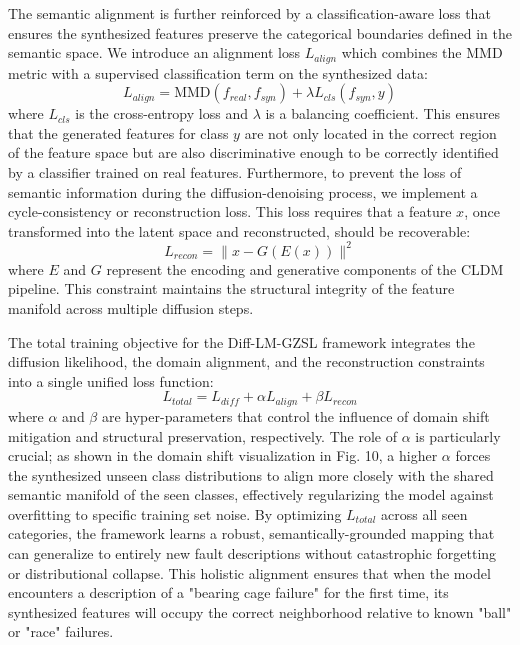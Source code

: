 The semantic alignment is further reinforced by a classification-aware loss that ensures the synthesized features preserve the categorical boundaries defined in the semantic space. We introduce an alignment loss $L_{align}$ which combines the MMD metric with a supervised classification term on the synthesized data:
\begin{equation}
L_{align} = \text{MMD}(f_{real}, f_{syn}) + \lambda L_{cls}(f_{syn}, y)
\end{equation}
where $L_{cls}$ is the cross-entropy loss and $\lambda$ is a balancing coefficient. This ensures that the generated features for class $y$ are not only located in the correct region of the feature space but are also discriminative enough to be correctly identified by a classifier trained on real features. Furthermore, to prevent the loss of semantic information during the diffusion-denoising process, we implement a cycle-consistency or reconstruction loss. This loss requires that a feature $x$, once transformed into the latent space and reconstructed, should be recoverable:
\begin{equation}
L_{recon} = \|x - G(E(x))\|^2
\end{equation}
where $E$ and $G$ represent the encoding and generative components of the CLDM pipeline. This constraint maintains the structural integrity of the feature manifold across multiple diffusion steps.

The total training objective for the Diff-LM-GZSL framework integrates the diffusion likelihood, the domain alignment, and the reconstruction constraints into a single unified loss function:
\begin{equation}
L_{total} = L_{diff} + \alpha L_{align} + \beta L_{recon}
\end{equation}
where $\alpha$ and $\beta$ are hyper-parameters that control the influence of domain shift mitigation and structural preservation, respectively. The role of $\alpha$ is particularly crucial; as shown in the domain shift visualization in Fig. 10, a higher $\alpha$ forces the synthesized unseen class distributions to align more closely with the shared semantic manifold of the seen classes, effectively regularizing the model against overfitting to specific training set noise. By optimizing $L_{total}$ across all seen categories, the framework learns a robust, semantically-grounded mapping that can generalize to entirely new fault descriptions without catastrophic forgetting or distributional collapse. This holistic alignment ensures that when the model encounters a description of a "bearing cage failure" for the first time, its synthesized features will occupy the correct neighborhood relative to known "ball" or "race" failures.

